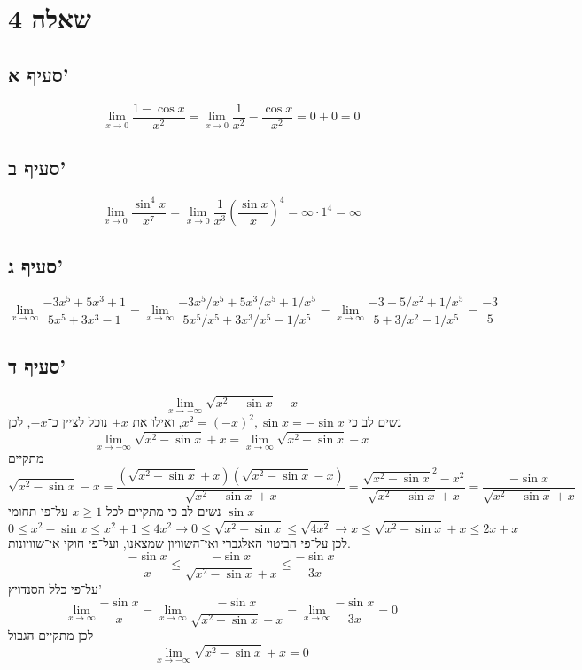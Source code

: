 \section{שאלה 4}
\subsection{סעיף א'}
\[
	\lim_{x \to 0} \frac{1 - \cos x}{x^2}
	= \lim_{x \to 0} \frac{1}{x^2} - \frac{\cos x}{x^2}
	= 0 + 0 = 0
\]

\subsection{סעיף ב'}
\[
	\lim_{x \to 0} \frac{\sin^4 x}{x^7}
	= \lim_{x \to 0} \frac{1}{x^3} {\left( \frac{\sin x}{x} \right)}^4
	= \infty \cdot 1^4
	= \infty
\]

\subsection{סעיף ג'}
\[
	\lim_{x \to \infty} \frac{-3x^5 + 5x^3 + 1}{5x^5 + 3x^3 - 1}
	= \lim_{x \to \infty} \frac{-3x^5/x^5 + 5x^3/x^5 + 1/x^5}{5x^5/x^5 + 3x^3/x^5 - 1/x^5}
	= \lim_{x \to \infty} \frac{-3 + 5/x^2 + 1/x^5}{5 + 3/x^2 - 1/x^5}
	= \frac{-3}{5}
\]

\subsection{סעיף ד'}
\[
	\lim_{x \to -\infty} \sqrt{x^2 - \sin x} + x
\]
נשים לב כי $x^2 = {(-x)}^2, \sin x = - \sin x$, ואילו את $+x$ נוכל לציין כ־$-x$, לכן
\[
	\lim_{x \to -\infty} \sqrt{x^2 - \sin x} + x
	= \lim_{x \to \infty} \sqrt{x^2 - \sin x} - x
\]
מתקיים
\[
	\sqrt{x^2 - \sin x} - x
	= \frac{\left(\sqrt{x^2 - \sin x} + x\right) \left(\sqrt{x^2 - \sin x} - x\right)}{\sqrt{x^2 - \sin x} + x}
	= \frac{ \sqrt{x^2 - \sin x}^2 - x^2}{\sqrt{x^2 - \sin x} + x}
	= \frac{ -\sin x}{\sqrt{x^2 - \sin x} + x}
\]
נשים לב כי מתקיים לכל $x \ge 1$ על־פי תחומי $\sin x$
\[
	0 \le x^2 - \sin x \le x^2 + 1 \le 4x^2
	\rightarrow
	0 \le \sqrt{x^2 - \sin x} \le \sqrt{4x^2}
	\rightarrow
	x \le \sqrt{x^2 - \sin x} + x \le 2x + x
\]
לכן על־פי הביטוי האלגברי ואי־השוויון שמצאנו, ועל־פי חוקי אי־שוויונות.
\[
	\frac{ -\sin x}{x}
	\le
	\frac{ -\sin x}{\sqrt{x^2 - \sin x} + x}
	\le
	\frac{ -\sin x}{3x}
\]
על־פי כלל הסנדויץ'
\[
	\lim_{x \to \infty} \frac{ -\sin x}{x}
	= \lim_{x \to \infty} \frac{ -\sin x}{\sqrt{x^2 - \sin x} + x}
	= \lim_{x \to \infty} \frac{ -\sin x}{3x}
	= 0
\]
לכן מתקיים הגבול
\[
	\lim_{x \to -\infty} \sqrt{x^2 - \sin x} + x = 0
\]

